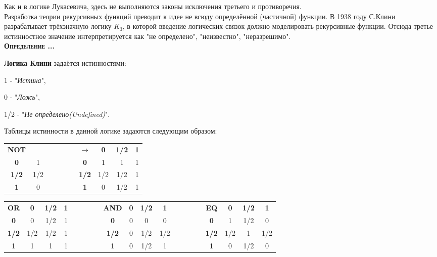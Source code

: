 \documentclass[18pt, a4paper]{extarticle}
\newcounter{par}
\newcounter{spar}
\newcounter{zap}
\newcommand{\opr}{\textbf{\textsc{Определение \thepar.\if\thespar1\thespar.\fi\thezap.\;}}\stepcounter{zap}}
\begin{document}
Как и в логике Лукасевича, здесь не выполняются законы исключения третьего и противоречия.\\

Разработка теории рекурсивных функций преводит к идее не всюду определённой (частичной) функции. В 1938 году С.Клини разрабатывает трёхзначную логику $K_3$, в которой введение логических связок должно моделировать рекурсивные функции. Отсюда третье истинностное значение интерпретируется как "не определено"{}, "неизвестно"{}, "неразрешимо"{}.\\

\opr

\textbf{Логика Клини} задаётся истинностями: 

1 - "\textit{Истина}"{}, 

0 - "\textit{Ложь}"{}, 

1/2 - "\textit{Не определено(Undefined)}"{}.

Таблицы истинности в данной логике задаются следующим образом:

\begin{center}
\begin{tabular}{|c|c|llll|c|c|c|c|}
\cline{1-2} \cline{7-10}
\textbf{NOT} & & & & & & \textbf{$\rightarrow$} & \textbf{0} & \textbf{1/2} & \textbf{1} \\
\cline{1-2} \cline{7-10}
\textbf{0} & 1 & & & & & \textbf{0} & 1 & 1 & 1 \\
\cline{1-2} \cline{7-10}
\textbf{1/2} & 1/2 & & & & & \textbf{1/2} & 1/2 & 1/2 & 1 \\
\cline{1-2} \cline{7-10}
\textbf{1} & 0 & & & & & \textbf{1} & 0 & 1/2 & 1 \\
\cline{1-2} \cline{7-10}
\end{tabular}
\end{center}

\begin{center}
\begin{tabular}{|c|c|c|c|llll|c|c|c|c|llll|c|c|c|c|}
\cline{1-4} \cline{9-12} \cline{17-20}
\textbf{OR} & \textbf{0} & \textbf{1/2} & \textbf{1} & & & & & \textbf{AND} & \textbf{0} & \textbf{1/2} & \textbf{1} & & & & & \textbf{EQ} & \textbf{0} & \textbf{1/2} & \textbf{1} \\
\cline{1-4} \cline{9-12} \cline{17-20} 
\textbf{0} & 0 & 1/2 & 1 & & & & & \textbf{0} & 0 & 0 & 0 & & & & & \textbf{0} & 1 & 1/2 & 0 \\ 
\cline{1-4} \cline{9-12} \cline{17-20} 
\textbf{1/2} & 1/2 & 1/2 & 1 & & & & & \textbf{1/2} & 0 & 1/2 & 1/2 & & & & & \textbf{1/2} & 1/2 & 1 & 1/2 \\ 
\cline{1-4} \cline{9-12} \cline{17-20} 
\textbf{1} & 1 & 1 & 1 & & & & & \textbf{1} & 0 & 1/2 & 1 & & & & & \textbf{1} & 0 & 1/2 & 0 \\ 
\cline{1-4} \cline{9-12} \cline{17-20} 
\end{tabular}
\end{center}\\
\end{document}
